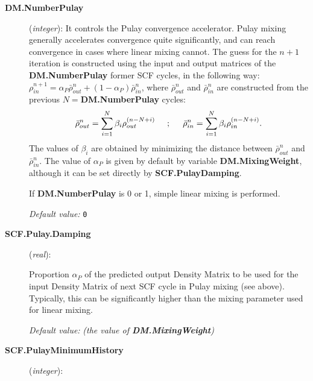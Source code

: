 \begin{description}
\item[\textbf{DM.NumberPulay}] (\textit{integer}):
It controls the Pulay convergence accelerator. Pulay mixing generally
accelerates convergence quite significantly, and can
reach convergence in cases where linear mixing cannot.
The guess for the $n+1$ iteration is constructed using the
input and output matrices of the \textbf{DM.NumberPulay} former
SCF cycles, in the following way:
$\rho^{n+1}_{in} = \alpha_P \bar{\rho}^{n}_{out}
+(1 - \alpha_P) \bar{\rho}^{n}_{in}$, where $\bar{\rho}^{n}_{out}$
and $\bar{\rho}^{n}_{in}$ are constructed from the previous
$N=$\textbf{DM.NumberPulay} cycles:
%
\begin{equation}
\bar{\rho}^{n}_{out} = \sum_{i=1}^N
\beta_i \rho_{out}^{(n-N+i)} \hspace{0.5truecm}; \hspace{0.5truecm}
\bar{\rho}^{n}_{in} = \sum_{i=1}^N
\beta_i \rho_{in}^{(n-N+i)}.
\nonumber
\end{equation}
%
The values of $\beta_i$ are obtained by minimizing the distance
between $\bar{\rho}^{n}_{out}$ and $\bar{\rho}^{n}_{in}$.
The value of $\alpha_P$ is given by default by variable \textbf{DM.MixingWeight}, although it can be set directly by \textbf{SCF.PulayDamping}.

If \textbf{DM.NumberPulay} is 0 or 1, simple linear mixing is
performed.

\textit{Default value:} \texttt{0}


\item[\textbf{SCF.Pulay.Damping}] (\textit{real}):

Proportion $\alpha_P$ of the predicted
output Density Matrix to be used for the input Density Matrix of
next SCF cycle in Pulay mixing (see above). Typically, this can be
significantly higher than the mixing parameter used for linear
mixing. 

\textit{Default value:} \textit{(the value of \textbf{DM.MixingWeight})}

\item[\textbf{SCF.PulayMinimumHistory}] (\textit{integer}):


\end{description}
